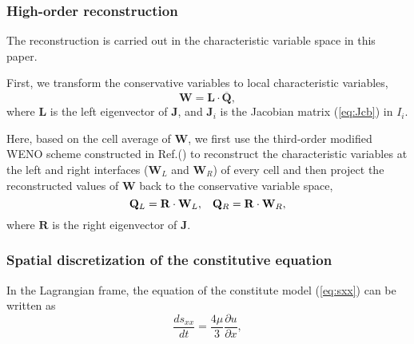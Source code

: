 \documentclass[review]{elsarticle}
\begin{document}
\subsubsection{High-order reconstruction}\label{hor}
The reconstruction is carried out in the characteristic variable  space in this paper.

First, we transform the conservative variables to local characteristic variables,
\begin{equation}\label{eq:chaVar}
  \mathbf{W} = \mathbf{L} \cdot \overline{\mathbf{Q}},
\end{equation}
where $\mathbf{L}$ is the left eigenvector of $\mathbf{J}$, and $\mathbf{J}_i$ is the Jacobian matrix  (\ref{eq:Jcb}) in $I_i$.

Here, based on the cell average of $\mathbf{W}$, we  first use the third-order modified WENO scheme constructed in Ref.(\cite{liu2018novel}) to reconstruct the characteristic variables at the  left and right interfaces ($\mathbf{W}_L$ and $\mathbf{W}_R$)  of every cell and then project the reconstructed values of $\mathbf{W}$ back to the conservative variable space,
\begin{equation}
  \mathbf{Q}_L = \mathbf{R} \cdot \mathbf{W}_L, \hspace{0.3cm}   \mathbf{Q}_R = \mathbf{R} \cdot \mathbf{W}_R,
\end{equation}
where $\mathbf{R}$ is the right eigenvector of $\mathbf{J}$.

\subsubsection{Spatial discretization of the constitutive equation}
In the Lagrangian frame, the equation of the constitute model (\ref{eq:sxx}) can be written as
\begin{equation}
  \frac{ds_{xx}}{dt} = \frac{4\mu }{3} \frac{\partial u}{\partial x},
\end{equation}
\end{document}
